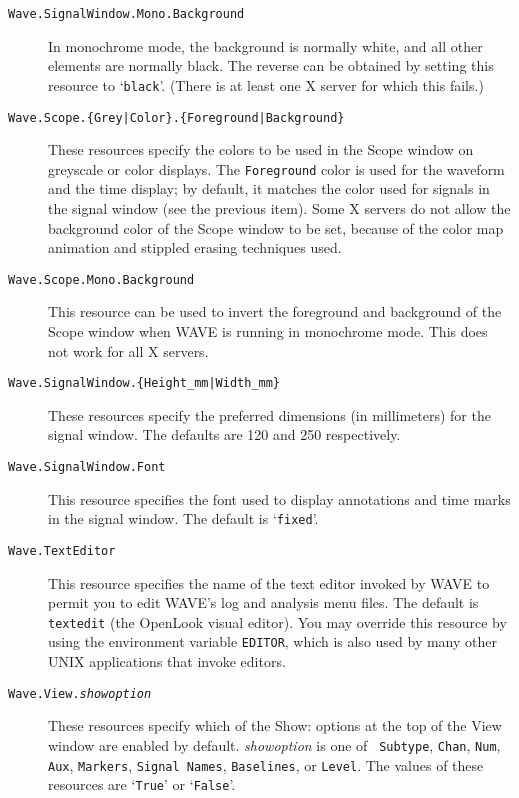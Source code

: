 \documentclass[twoside]{book}
\newcommand{\WAVE}{{\sf WAVE}\xspace}
\begin{document}
\begin{description}
\item[{\tt Wave.SignalWindow.Mono.Background}]
In monochrome mode, the background is normally white, and all other
elements are normally black.  The reverse can be obtained by setting this
resource to `{\tt black}'.  (There is at least one X server for which this
fails.)

\item[{\tt Wave.Scope.\{Grey|Color\}.\{Foreground|Background\}}]

These resources specify the colors to be used in the {\sf Scope}
window on greyscale or color displays.  The {\tt Foreground} color is
used for the waveform and the time display; by default, it matches the
color used for signals in the signal window (see the previous item).
Some X servers do not allow the background color of the {\sf Scope}
window to be set, because of the color map animation and stippled
erasing techniques used.

\item[{\tt Wave.Scope.Mono.Background}]
This resource can be used to invert the foreground and background of
the {\sf Scope} window when \WAVE{} is running in monochrome mode.
This does not work for all X servers.

\item[{\tt Wave.SignalWindow.\{Height\_mm|Width\_mm\}}]
These resources specify the preferred dimensions (in millimeters) for the
signal window.  The defaults are 120 and 250 respectively.

\item[{\tt Wave.SignalWindow.Font}]
This resource specifies the font used to display annotations and time marks in
the signal window.  The default is `{\tt fixed}'.

\item[{\tt Wave.TextEditor}]
This resource specifies the name of the text editor invoked by \WAVE{} to
permit you to edit \WAVE{}'s log and analysis menu files.  The default is
{\tt textedit} (the OpenLook visual editor).  You may override this resource
by using the environment variable {\tt EDITOR}, which is also used by many
other UNIX applications that invoke editors.

\item[{\tt Wave.View.{\it showoption}}]
These resources specify which of the {\sf Show:} options at the top of the
{\sf View} window are enabled by default.  {\it showoption} is one of {\tt
Subtype}, {\tt Chan}, {\tt Num}, {\tt Aux}, {\tt Markers}, {\tt Signal
Names}, {\tt Baselines}, or {\tt Level}.  The values of these
resources are `{\tt True}' or `{\tt False}'.


\end{description}
\end{document}
